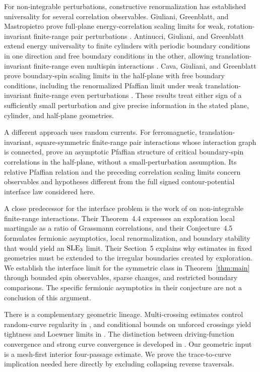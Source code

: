 For non-integrable perturbations, constructive renormalization has
established universality for several correlation observables.
Giuliani, Greenblatt, and Mastropietro prove full-plane energy-correlation
scaling limits for weak, rotation-invariant finite-range pair
perturbations \citep{GGM2012}. Antinucci, Giuliani, and Greenblatt
extend energy universality to finite cylinders with periodic boundary
conditions in one direction and free boundary conditions in the other,
allowing translation-invariant finite-range even multispin interactions
\citep[Theorem~1.1 and Corollary~1.2]{AGG2023Cylinder}.
Cava, Giuliani, and Greenblatt prove boundary-spin scaling limits in
the half-plane with free boundary conditions, including the
renormalized Pfaffian limit under weak translation-invariant finite-range
even perturbations
\citep[Theorem~1.1]{CGG2025Boundary}.
These results treat either sign of a sufficiently small perturbation
and give precise information in the stated plane, cylinder, and half-plane
geometries.

A different approach uses random currents. For ferromagnetic,
translation-invariant, square-symmetric finite-range pair interactions
whose interaction graph is connected,
\citet[Theorem~1.2]{AizenmanDuminilCopinTassionWarzel2019}
prove an asymptotic Pfaffian structure of critical boundary-spin
correlations in the half-plane, without a small-perturbation assumption.
Its relative Pfaffian relation and the preceding correlation scaling
limits concern observables and hypotheses different from the full
signed contour-potential interface law considered here.

A close predecessor for the interface problem is the work of
\citet{GreenblattPeltola2024} on non-integrable finite-range
interactions. Their Theorem~4.4 expresses an exploration local martingale as a ratio
of Grassmann correlations, and their Conjecture~4.5 formulates fermionic
asymptotics,
local renormalization, and boundary stability that would yield an
\(\operatorname{SLE}_3\) limit. Their Section~5 explains why estimates in fixed
geometries must be extended to the irregular boundaries created by
exploration. We establish the interface limit for the symmetric class
in Theorem~\ref{thm:main} through bounded spin observables, sparse
changes, and restricted boundary comparisons. The specific fermionic
asymptotics in their conjecture are not a conclusion of this argument.

There is a complementary geometric lineage. Multi-crossing estimates
control random-curve regularity in
\citet[Hypothesis~H1 and Theorem~1.1]{AizenmanBurchard1999}, and
conditional bounds on unforced crossings yield tightness and Loewner limits in
\citet[Condition~G2 and Theorem~1.5]{KemppainenSmirnov2017}.
The distinction between driving-function
convergence and strong curve convergence is developed in
\citet[Theorem~1.2 and Example~2.1]{SheffieldSun2012}.
Our geometric input is a mesh-first interior
four-passage estimate. We prove the trace-to-curve implication needed
here directly by excluding collapsing reverse traversals.

